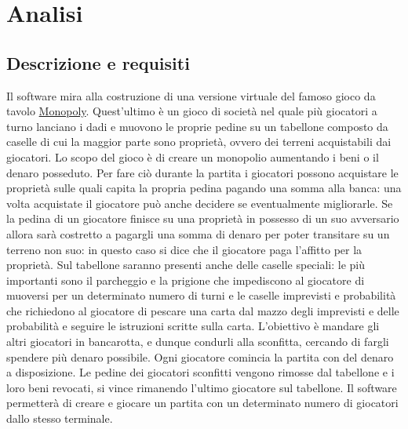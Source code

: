 \chapter{Analisi}

\section{Descrizione e requisiti}
Il software mira alla costruzione di una versione virtuale del famoso gioco da tavolo \href{https://it.wikipedia.org/wiki/Monopoly}{Monopoly}. 
Quest’ultimo è un gioco di società nel quale più giocatori a turno lanciano i dadi e muovono le proprie pedine su un tabellone 
composto da caselle di cui la maggior parte sono proprietà, ovvero dei terreni acquistabili dai giocatori.
Lo scopo del gioco è di creare un monopolio aumentando i beni o il denaro posseduto. 
Per fare ciò durante la partita i giocatori possono acquistare le proprietà sulle quali capita la propria pedina pagando una somma alla banca: 
una volta acquistate il giocatore può anche decidere se eventualmente migliorarle.
Se la pedina di un giocatore finisce su una proprietà in possesso di un suo avversario allora sarà costretto
a pagargli una somma di denaro per poter transitare su un terreno non suo: in questo caso si dice che il giocatore
paga l'affitto per la proprietà.\newline
Sul tabellone saranno presenti anche delle caselle speciali: le più importanti sono il parcheggio e la prigione che
impediscono al giocatore di muoversi per un determinato numero di turni e le caselle imprevisti e probabilità che 
richiedono al giocatore di pescare una carta dal mazzo degli imprevisti e delle probabilità e seguire le 
istruzioni scritte sulla carta.\newline
L’obiettivo è mandare gli altri giocatori in bancarotta, e dunque condurli alla sconfitta, cercando di fargli spendere
più denaro possibile. Ogni giocatore comincia la partita con del denaro a disposizione. Le pedine dei giocatori sconfitti vengono rimosse dal tabellone e i loro 
beni revocati, si vince rimanendo l'ultimo giocatore sul tabellone.\newline
Il software permetterà di creare e giocare un partita con un determinato numero di giocatori dallo 
stesso terminale.


